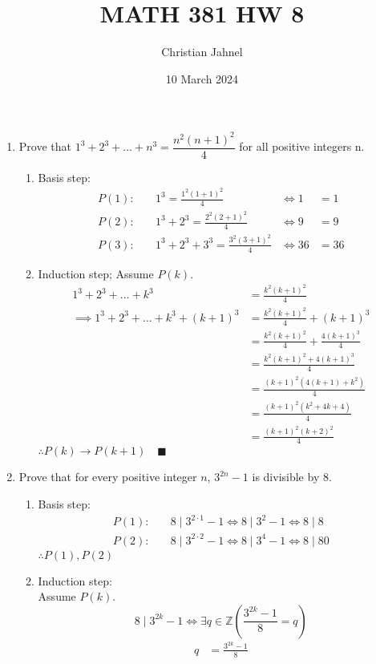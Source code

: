\documentclass[letterpaper, 12pt]{article}
\title{MATH 381 HW 8}
\author{Christian Jahnel}
\date{10 March 2024}
\newcommand{\qed}{\quad \blacksquare}
\newcommand{\then}{\rightarrow}
\newcommand{\Z}{\mathbb{Z}}
\newcommand{\0}{\emptyset}
\begin{document}
\maketitle
\begin{enumerate}
\item Prove that $1^3 + 2^3 + \dots + n^3 = \dfrac{n^2(n+1)^2}{4}$ for all positive integers n.
\begin{enumerate}
\item Basis step:
\begin{align*}
    P(1): &\quad 1^3 = \frac{1^2(1+1)^2}{4} &\iff 1 &= 1 \\
    P(2): &\quad 1^3 + 2^3 = \frac{2^2(2+1)^2}{4} &\iff 9 &= 9 \\
    P(3): &\quad 1^3 + 2^3 + 3^3 = \frac{3^2(3+1)^2}{4} &\iff 36 &= 36
\end{align*}
\item Induction step; Assume $P(k)$.
\begin{align*}
    1^3 + 2^3 + \dots + k^3 &= \frac{k^2(k+1)^2}{4} \\
    \implies 1^3 + 2^3 + \dots + k^3 + (k+1)^3 &= \frac{k^2(k+1)^2}{4} + (k+1)^3 \\
    &= \frac{k^2(k+1)^2}{4} + \frac{4(k+1)^3}{4} \\
    &= \frac{k^2(k+1)^2 + 4(k+1)^3}{4} \\
    &= \frac{(k+1)^2(4(k+1) + k^2)}{4} \\
    &= \frac{(k+1)^2(k^2 + 4k + 4)}{4} \\
    &= \frac{(k+1)^2(k + 2)^2}{4}
\end{align*}
$\therefore P(k) \then P(k + 1) \qed$
\end{enumerate}
\item Prove that for every positive integer $n$, $3^{2n} - 1$ is divisible by 8.
\begin{enumerate}
\item Basis step:
\begin{align*}
    P(1): &\quad 8 \mid 3^{2 \cdot 1} - 1 \iff 8 \mid 3^2 - 1 \iff 8 \mid 8 \\
    P(2): &\quad 8 \mid 3^{2 \cdot 2} - 1 \iff 8 \mid 3^4 - 1 \iff 8 \mid 80
\end{align*}
$\therefore P(1), P(2)$
\item Induction step: \\
Assume $P(k)$.
\[8 \mid 3^{2k} - 1 \iff \exists q \in \Z \left(\frac{3^{2k} - 1}{8} = q\right)\]
\begin{align*}
    q &= \frac{3^{2k} - 1}{8} \\

\end{align*}
\end{enumerate}
\end{enumerate}
\end{document}
